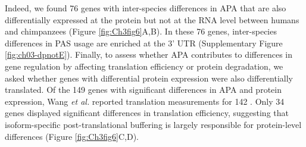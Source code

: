 Indeed, we found 76 genes with inter-species differences in APA that are also differentially expressed at the protein but not at the RNA level between humans and chimpanzees (Figure \ref{fig:Ch3fig6}A,B). In these 76 genes, inter-species differences in PAS usage are enriched at the 3' UTR (Supplementary Figure \ref{fig:ch03-dpnotE}). Finally, to assess whether APA contributes to differences in gene regulation by affecting translation efficiency or protein degradation, we asked whether genes with differential protein expression were also differentially translated. Of the 149 genes with significant differences in APA and protein expression, Wang \emph{et al.} reported translation measurements for 142 \citep{wang_post-translational_2018}. Only 34 genes displayed significant differences in translation efficiency, suggesting that isoform-specific post-translational buffering is largely responsible for protein-level differences (Figure \ref{fig:Ch3fig6}C,D). 


